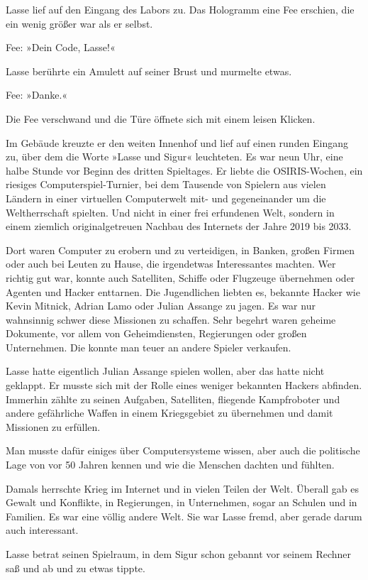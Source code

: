 Lasse lief auf den Eingang des Labors zu. Das Hologramm eine Fee erschien, die ein wenig größer war als er selbst.

Fee: »Dein Code, Lasse!«

Lasse berührte ein Amulett auf seiner Brust und murmelte etwas.

Fee: »Danke.«

Die Fee verschwand und die Türe öffnete sich mit einem leisen Klicken.

Im Gebäude kreuzte er den weiten Innenhof und lief auf einen runden Eingang zu, über dem die Worte »Lasse und Sigur« leuchteten.
Es war neun Uhr, eine halbe Stunde vor Beginn des dritten Spieltages.
Er liebte die OSIRIS-Wochen, ein riesiges Computerspiel-Turnier, bei dem Tausende von Spielern aus vielen Ländern in einer virtuellen Computerwelt mit- und gegeneinander um die Weltherrschaft spielten.
Und nicht in einer frei erfundenen Welt, sondern in einem ziemlich originalgetreuen Nachbau des Internets der Jahre 2019 bis 2033.

Dort waren Computer zu erobern und zu verteidigen, in Banken, großen Firmen oder auch bei Leuten zu Hause, die irgendetwas Interessantes machten.
Wer richtig gut war, konnte auch Satelliten, Schiffe oder Flugzeuge übernehmen oder Agenten und Hacker enttarnen.
Die Jugendlichen liebten es, bekannte Hacker wie Kevin Mitnick, Adrian Lamo oder Julian Assange zu jagen.
Es war nur wahnsinnig schwer diese Missionen zu schaffen.
Sehr begehrt waren geheime Dokumente, vor allem von Geheimdiensten, Regierungen oder großen Unternehmen. Die konnte man teuer an andere Spieler verkaufen.

Lasse hatte eigentlich Julian Assange spielen wollen, aber das hatte nicht geklappt.
Er musste sich mit der Rolle eines weniger bekannten Hackers abfinden.
Immerhin zählte zu seinen Aufgaben, Satelliten, fliegende Kampfroboter und andere gefährliche Waffen in einem Kriegsgebiet zu übernehmen und damit Missionen zu erfüllen.

Man musste dafür einiges über Computersysteme wissen, aber auch die politische Lage von vor 50 Jahren kennen und wie die Menschen dachten und fühlten.

Damals herrschte Krieg im Internet und in vielen Teilen der Welt.
Überall gab es Gewalt und Konflikte, in Regierungen, in Unternehmen, sogar an Schulen und in Familien.
Es war eine völlig andere Welt.
Sie war Lasse fremd, aber gerade darum auch interessant.

Lasse betrat seinen Spielraum, in dem Sigur schon gebannt vor seinem Rechner saß und ab und zu etwas tippte.

